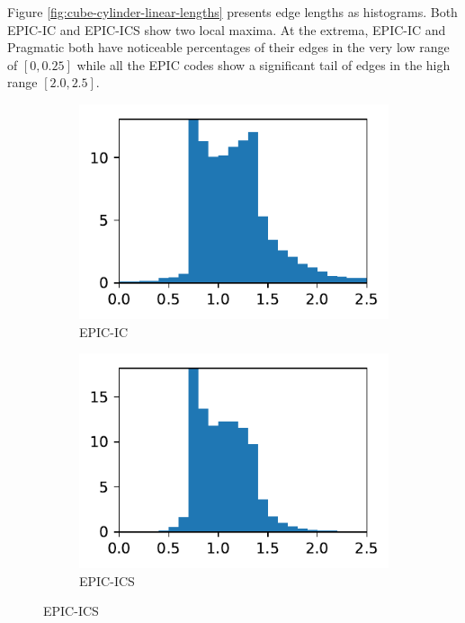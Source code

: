 \documentclass[3p,times,procedia,number]{elsarticle}
\begin{document}
Figure \ref{fig:cube-cylinder-linear-lengths} presents edge lengths
as histograms.
Both EPIC-IC and EPIC-ICS show two local maxima.
At the extrema, EPIC-IC and Pragmatic both have noticeable
percentages of their edges in the very low range of $[0,0.25]$
while all the EPIC codes show a significant tail of edges
in the high range $[2.0,2.5]$.
\begin{figure}
\begin{subfigure}{.16\textwidth}
\centering
\includegraphics[width=\textwidth]{epic-ic-cube-cylinder-linear-length.pdf}
\caption{EPIC-IC}
\end{subfigure}
\begin{subfigure}{.16\textwidth}
\centering
\includegraphics[width=\textwidth]{epic-ics-cube-cylinder-linear-length.pdf}
\caption{EPIC-ICS}
\end{subfigure}

\end{figure}
\end{document}
